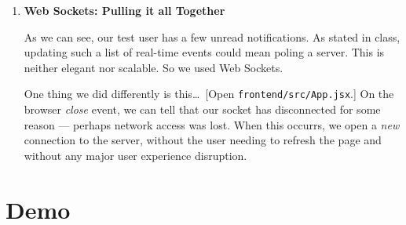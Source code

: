 \documentclass[12pt]{article}
\begin{document}
\begin{enumerate}[label={(\arabic*)}]
	\item {\bfseries Web Sockets: Pulling it all Together}

		As we can see, our test user has a few unread notifications. As stated in class, updating such a list of real-time events could mean poling a server. This is neither elegant nor scalable. So we used Web Sockets. 

		One thing we did differently is this\ldots\ [Open \verb|frontend/src/App.jsx|.] On the browser {\em close} event, we can tell that our socket has disconnected for some reason --- perhaps network access was lost. When this occurrs, we open a {\em new} connection to the server, without the user needing to refresh the page and without any major user experience disruption.
\end{enumerate}


\section{Demo}
\end{document}
